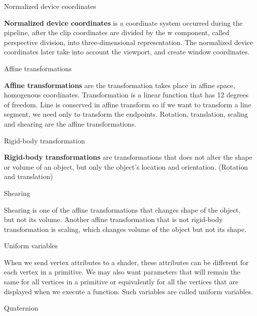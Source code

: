 \documentclass[10pt,a4paper]{article}
\begin{document}
\begin{enumerate}
		{\large \item Normalized device coordinates}
				
			\textbf{Normalized device coordinates} is a coordinate system occurred during the pipeline, after the clip coordinates are divided by the w component, called perspective division, into three-dimensional representation. The normalized device coordinates later take into account the viewport, and create window coordinates.\\
			
		{\large \item Affine transformations}
				
			 \textbf{Affine transformations} are the transformation takes place in affine space, homogenous coordinates. Transformation is a linear function that has 12 degrees of freedom. Line is conserved in affine transform so if we want to transform a line segment, we need only to transform the endpoints. Rotation, translation, scaling and shearing are the affine transformations.\\
			 
		{\large \item Rigid-body transformation}
				
			 \textbf{Rigid-body transformations} are transformations that does not alter the shape or volume of an object, but only the object’s location and orientation. (Rotation and translation)\\
			 
		{\large \item Shearing}
				
			 Shearing is one of the affine transformations that changes shape of the object, but not its volume. Another affine transformation that is not rigid-body transformation is scaling, which changes volume of the object but not its shape.\\
			 
		{\large \item Uniform variables}
				
			When we send vertex attributes to a shader, these attributes can be different for each vertex in a primitive. We may also want parameters that will remain the same for all vertices in a primitive or equivalently for all the vertices that are displayed when we execute a function. Such variables are called uniform variables.\\
			
		{\large \item Quaternion}
				

\end{enumerate}
\end{document}
